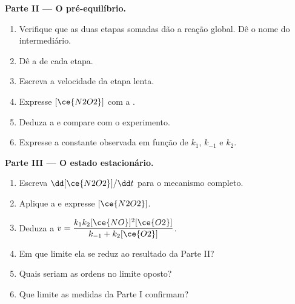 \begin{problem}
\medskip
\noindent\textbf{Parte II --- O pré-equilíbrio.}
\begin{enumerate}[resume]
  \item Verifique que as duas etapas somadas dão a reação global. Dê o
        nome do intermediário.
  \item Dê a  de cada etapa.
  \item Escreva a velocidade da etapa lenta.
  \item Expresse $[\ce{N2O2}]$ com a .
  \item Deduza a  e compare com o experimento.
  \item Expresse a constante observada em função de $k_1$, $k_{-1}$ e $k_2$.
\end{enumerate}

\medskip
\noindent\textbf{Parte III --- O estado estacionário.}
\begin{enumerate}[resume]
  \item Escreva $\dd[\ce{N2O2}]/\dd t$ para o mecanismo completo.
  \item Aplique a  e expresse $[\ce{N2O2}]$.
  \item Deduza a  $v = \dfrac{k_1k_2[\ce{NO}]^2[\ce{O2}]}{k_{-1} +
        k_2[\ce{O2}]}$.
  \item Em que limite ela se reduz ao resultado da Parte II?
  \item Quais seriam as ordens no limite oposto?
  \item Que limite as medidas da Parte I confirmam?
\end{enumerate}


\end{problem}
